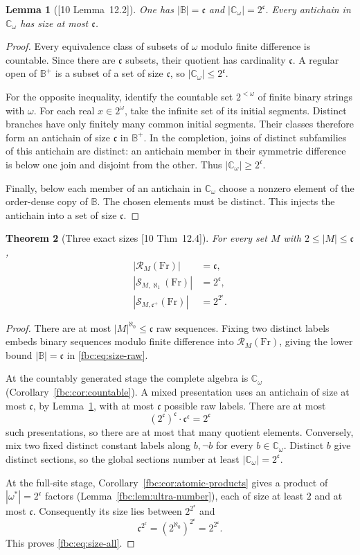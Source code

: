 \documentclass[11pt,letterpaper]{article}
\newtheorem{theorem}{Theorem}[section]
\newtheorem{lemma}[theorem]{Lemma}
\theoremstyle{definition}
\theoremstyle{remark}
\newcommand{\om}{\omega}
\newcommand{\Fr}{\mathrm{Fr}}
\newcommand{\B}{\mathbb B}
\newcommand{\C}{\mathbb C}
\newcommand{\cc}{\mathfrak c}
\newcommand{\R}{\mathscr R}
\newcommand{\Ssh}{\mathscr S}
\newcommand{\src}[1]{\textup{[#1]}}
\begin{document}
\begin{lemma}[\src{10 Lemma~12.2}]\label{fbc:lem:sizeC}
One has $|\B|=\cc$ and $|\C_\om|=2^{\cc}$. Every antichain in
$\C_\om$ has size at most $\cc$.
\end{lemma}
\begin{proof}
Every equivalence class of subsets of $\om$ modulo finite difference
is countable. Since there are $\cc$ subsets, their quotient has
cardinality $\cc$. A regular open of $\B^+$ is a subset of a set of
size $\cc$, so $|\C_\om|\leq2^{\cc}$.

For the opposite inequality, identify the countable set $2^{<\om}$
of finite binary strings with $\om$. For each real $x\in2^\om$,
take the infinite set of its initial segments. Distinct branches have
only finitely many common initial segments. Their classes therefore
form an antichain of size $\cc$ in $\B^+$. In the completion, joins
of distinct subfamilies of this antichain are distinct: an antichain
member in their symmetric difference is below one join and disjoint
from the other. Thus $|\C_\om|\geq2^{\cc}$.

Finally, below each member of an antichain in $\C_\om$ choose a nonzero
element of the order-dense copy of $\B$. The chosen elements must be
distinct. This injects the antichain into a set of size $\cc$.
\end{proof}

\begin{theorem}[Three exact sizes \src{10 Thm~12.4}]
\label{fbc:thm:sizes}
For every set $M$ with $2\leq|M|\leq\cc$,
\begin{align}
 |\R_M(\Fr)|&=\cc,\label{fbc:eq:size-raw}\\
 |\Ssh_{M,\aleph_1}(\Fr)|&=2^{\cc},\label{fbc:eq:size-cg}\\
 |\Ssh_{M,\cc^+}(\Fr)|&=2^{2^{\cc}}.\label{fbc:eq:size-all}
\end{align}
\end{theorem}
\begin{proof}
There are at most $|M|^{\aleph_0}\leq\cc$ raw sequences. Fixing
two distinct labels embeds binary sequences modulo finite difference
into $\R_M(\Fr)$, giving the lower bound $|\B|=\cc$ in
\eqref{fbc:eq:size-raw}.

At the countably generated stage the complete algebra is $\C_\om$
(Corollary~\ref{fbc:cor:countable}). A mixed presentation uses an
antichain of size at most $\cc$, by Lemma~\ref{fbc:lem:sizeC}, with at
most $\cc$ possible raw labels. There are at most
\[
 (2^{\cc})^{\cc}\cdot\cc^{\cc}=2^{\cc}
\]
such presentations, so there are at most that many quotient elements.
Conversely, mix two fixed distinct constant labels along $b,\neg b$
for every $b\in\C_\om$. Distinct $b$ give distinct sections, so the
global sections number at least $|\C_\om|=2^{\cc}$.

At the full-site stage, Corollary~\ref{fbc:cor:atomic-products} gives a
product of $|\om^*|=2^{\cc}$ factors (Lemma~\ref{fbc:lem:ultra-number}),
each of size at least $2$ and at most $\cc$. Consequently its size lies
between $2^{2^{\cc}}$ and
\[
 \cc^{2^{\cc}}=(2^{\aleph_0})^{2^{\cc}}=2^{2^{\cc}}.
\]
This proves \eqref{fbc:eq:size-all}.
\end{proof}
\end{document}
